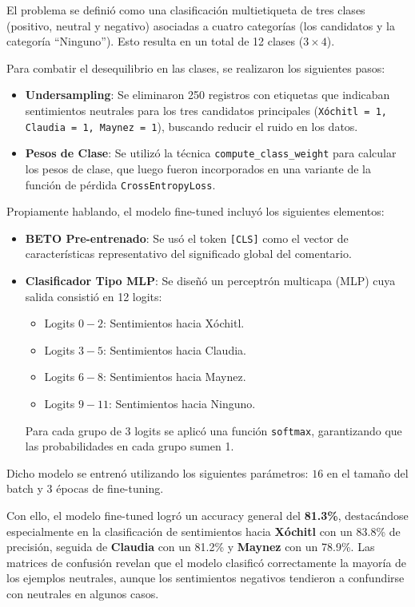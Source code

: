 \documentclass[10pt, a4paper]{article}
\begin{document}
	El problema se definió como una clasificación multietiqueta de tres clases (positivo, neutral y negativo) asociadas a cuatro categorías (los candidatos y la categoría ``Ninguno''). Esto resulta en un total de 12 clases (\(3 \times 4\)).
	
	Para combatir el desequilibrio en las clases, se realizaron los siguientes pasos:
	\begin{itemize}
		\item \textbf{Undersampling}: Se eliminaron 250 registros con etiquetas que indicaban sentimientos neutrales para los tres candidatos principales (\texttt{Xóchitl = 1, Claudia = 1, Maynez = 1}), buscando reducir el ruido en los datos.
		\item \textbf{Pesos de Clase}: Se utilizó la técnica \texttt{compute\_class\_weight} para calcular los pesos de clase, que luego fueron incorporados en una variante de la función de pérdida \texttt{CrossEntropyLoss}.
	\end{itemize}
	
	Propiamente hablando, el modelo fine-tuned incluyó los siguientes elementos:
	\begin{itemize}
		\item \textbf{BETO Pre-entrenado}: Se usó el token \texttt{[CLS]} como el vector de características representativo del significado global del comentario.
		\item \textbf{Clasificador Tipo MLP}: Se diseñó un perceptrón multicapa (MLP) cuya salida consistió en 12 logits:
		\begin{itemize}
			\item Logits \(0-2\): Sentimientos hacia Xóchitl.
			\item Logits \(3-5\): Sentimientos hacia Claudia.
			\item Logits \(6-8\): Sentimientos hacia Maynez.
			\item Logits \(9-11\): Sentimientos hacia Ninguno.
		\end{itemize}
		Para cada grupo de 3 logits se aplicó una función \texttt{softmax}, garantizando que las probabilidades en cada grupo sumen 1.
	\end{itemize}
	
	Dicho modelo se entrenó utilizando los siguientes parámetros: \(16\) en el tamaño del batch y \(3\) épocas de fine-tuning. 
	
	Con ello, el modelo fine-tuned logró un accuracy general del \textbf{81.3\%}, destacándose especialmente en la clasificación de sentimientos hacia \textbf{Xóchitl} con un 83.8\% de precisión, seguida de \textbf{Claudia} con un 81.2\% y \textbf{Maynez} con un 78.9\%. Las matrices de confusión revelan que el modelo clasificó correctamente la mayoría de los ejemplos neutrales, aunque los sentimientos negativos tendieron a confundirse con neutrales en algunos casos.
	
\end{document}
